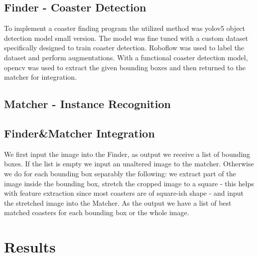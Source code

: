\documentclass{article}
\begin{document}
\subsection{Finder - Coaster Detection}

To implement a coaster finding program the utilized method was yolov5 object detection model small version. The model was fine tuned
with a custom dataset specifically designed to train coaster detection. Roboflow was used to label the dataset and perform augmentations.
With a functional coaster detection model, opencv was used to extract the given bounding boxes and then returned to the matcher for 
integration.

\subsection{Matcher - Instance Recognition}


\subsection{Finder\&Matcher Integration}

We first input the image into the Finder, as output we receive a list of bounding boxes.
If the list is empty we input an unaltered image to the matcher.
Otherwise we do for each bounding box separably the following: 
we extract part of the image inside the bounding box, 
stretch the cropped image to a square - this helps with feature extraction since most coasters are of square-ish shape - 
and input the stretched image into the Matcher.
As the output we have a list of best matched coasters for each bounding box or the whole image. 



\section{Results}
\end{document}
